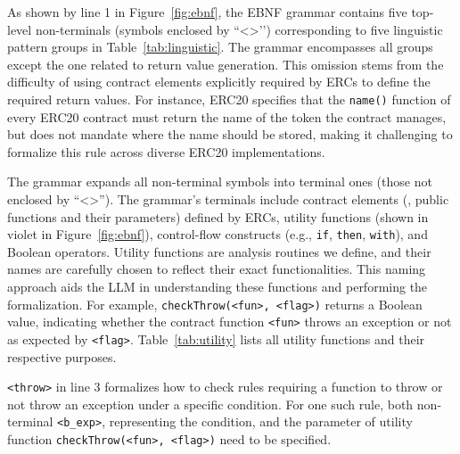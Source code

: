 



%

As shown by line 1 in Figure~\ref{fig:ebnf}, 
the EBNF grammar contains five top-level non-terminals (symbols enclosed by ``<>’’)
corresponding to five linguistic 
pattern groups in Table~\ref{tab:linguistic}. 
The grammar encompasses all groups except the one related to return value generation.
This omission stems from the difficulty of using contract elements explicitly required by ERCs to define the required return values. For instance, 
ERC20 specifies that the \texttt{name()} function of every ERC20 contract must return the name of the token the contract manages, 
but does not mandate where the name should be stored, making it challenging to formalize this rule across diverse ERC20 implementations.

The grammar expands all non-terminal symbols into terminal 
ones (those not enclosed by ``<>''). 
The grammar's terminals include contract elements 
(\eg, public functions and their parameters) defined by ERCs, 
utility functions (shown in violet in Figure~\ref{fig:ebnf}), 
control-flow constructs (e.g., \texttt{if}, \texttt{then}, \texttt{with}), 
and Boolean operators. Utility functions are analysis routines we define, 
and their names are carefully chosen to reflect their exact functionalities. 
This naming approach aids the LLM in understanding these functions 
and performing the formalization. For example, \texttt{checkThrow(<fun>, <flag>)} 
returns a Boolean value, indicating whether the contract function \texttt{<fun>} throws an exception or not as expected by \texttt{<flag>}. 
Table~\ref{tab:utility} lists all utility functions and their respective purposes.



\texttt{<throw>} in line 3 formalizes 
how to check rules requiring a function to throw or not throw an exception under a specific condition. 
For one such rule, 
both non-terminal \texttt{<b\_exp>}, representing the condition, 
and the parameter of utility function \texttt{checkThrow(<fun>, <flag>)} need to be specified.


